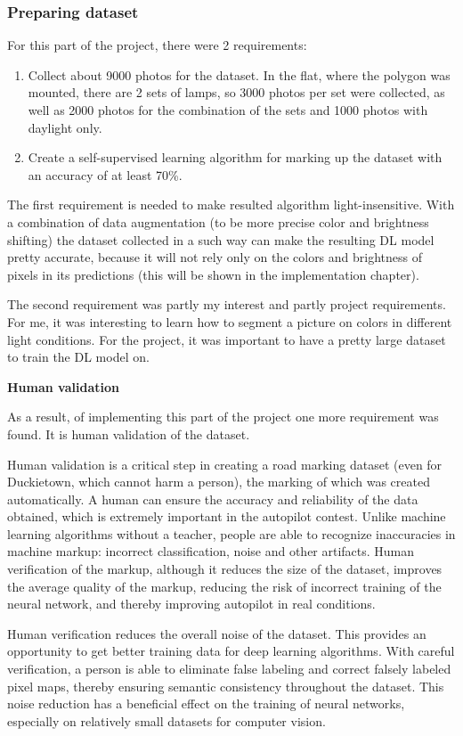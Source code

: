 \subsubsection{Preparing dataset}
For this part of the project, there were 2 requirements:
\begin{enumerate}
    \item Collect about 9000 photos for the dataset. In the flat, where the polygon was mounted, there are 2 sets of lamps, so 3000 photos per set were collected, 
    as well as 2000 photos for the combination of the sets and 1000 photos with daylight only.
    \item Create a self-supervised learning algorithm for marking up the dataset with an accuracy of at least 70\%. 
\end{enumerate}

The first requirement is needed to make resulted algorithm light-insensitive. With a combination of data augmentation 
(to be more precise color and brightness shifting) the dataset collected in a such way can make the resulting DL model pretty accurate, because
it will not rely only on the colors and brightness of pixels in its predictions (this will be shown in the implementation chapter).

The second requirement was partly my interest and partly project requirements. For me, it was interesting to learn how to segment a picture on colors in different 
light conditions. For the project, it was important to have a pretty large dataset to train the DL model on.

\textbf{Human validation}

As a result, of implementing this part of the project one more requirement was found. It is human validation of the dataset.

Human validation is a critical step in creating a road marking dataset (even for Duckietown, which cannot harm a person), the marking of which was created automatically. 
A human can ensure the accuracy and reliability of the data obtained, which is extremely important in the autopilot contest.
Unlike machine learning algorithms without a teacher, people are able to recognize inaccuracies in machine markup: incorrect classification, noise and 
other artifacts. Human verification of the markup, although it reduces the size of the dataset, improves the average quality of the markup, 
reducing the risk of incorrect training of the neural network, and thereby improving autopilot in real conditions.

Human verification reduces the overall noise of the dataset. This provides an opportunity to get better training data for deep learning algorithms.
With careful verification, a person is able to eliminate false labeling and correct falsely labeled pixel maps, thereby ensuring semantic consistency
throughout the dataset. This noise reduction has a beneficial effect on the training of neural networks, especially on relatively small datasets for 
computer vision.

